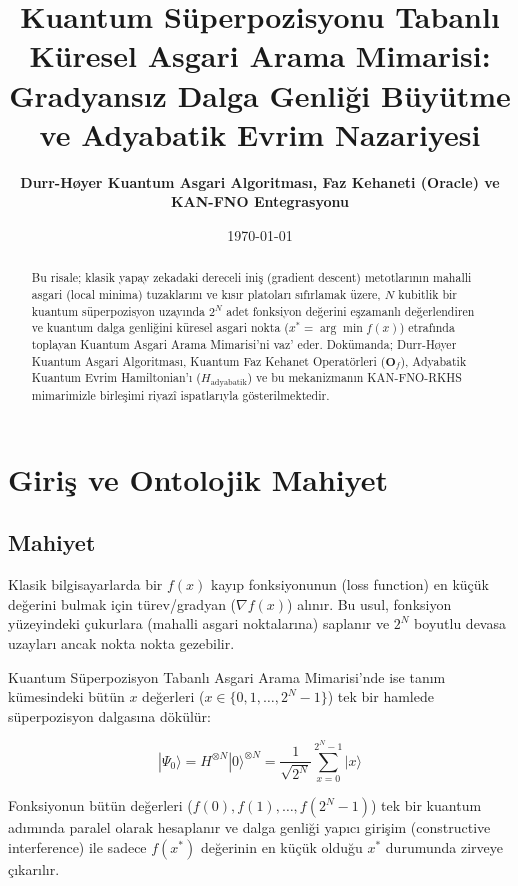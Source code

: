 \documentclass[11pt, a4paper]{article}
\title{\textbf{Kuantum Süperpozisyonu Tabanlı Küresel Asgari Arama Mimarisi: Gradyansız Dalga Genliği Büyütme ve Adyabatik Evrim Nazariyesi}}
\author{\textbf{Durr-Høyer Kuantum Asgari Algoritması, Faz Kehaneti (Oracle) ve KAN-FNO Entegrasyonu}}
\date{\today}
\begin{document}
\maketitle

\begin{abstract}
Bu risale; klasik yapay zekadaki dereceli iniş (gradient descent) metotlarının mahalli asgari (local minima) tuzaklarını ve kısır platoları sıfırlamak üzere, $N$ kubitlik bir kuantum süperpozisyon uzayında $2^N$ adet fonksiyon değerini eşzamanlı değerlendiren ve kuantum dalga genliğini küresel asgari nokta ($x^* = \arg\min f(x)$) etrafında toplayan Kuantum Asgari Arama Mimarisi'ni vaz' eder. Dokümanda; Durr-Høyer Kuantum Asgari Algoritması, Kuantum Faz Kehanet Operatörleri ($\mathbf{O}_f$), Adyabatik Kuantum Evrim Hamiltonian'ı ($H_{\text{adyabatik}}$) ve bu mekanizmanın KAN-FNO-RKHS mimarimizle birleşimi riyazî ispatlarıyla gösterilmektedir.
\end{abstract}

\tableofcontents
\newpage

\section{Giriş ve Ontolojik Mahiyet}

\subsection{Mahiyet}
Klasik bilgisayarlarda bir $f(x)$ kayıp fonksiyonunun (loss function) en küçük değerini bulmak için türev/gradyan ($\nabla f(x)$) alınır. Bu usul, fonksiyon yüzeyindeki çukurlara (mahalli asgari noktalarına) saplanır ve $2^N$ boyutlu devasa uzayları ancak nokta nokta gezebilir. 

Kuantum Süperpozisyon Tabanlı Asgari Arama Mimarisi'nde ise tanım kümesindeki bütün $x$ değerleri ($x \in \{0, 1, \dots, 2^N-1\}$) tek bir hamlede süperpozisyon dalgasına dökülür:

\begin{equation}
|\Psi_0\rangle = H^{\otimes N} |0\rangle^{\otimes N} = \frac{1}{\sqrt{2^N}} \sum_{x=0}^{2^N-1} |x\rangle
\end{equation}

Fonksiyonun bütün değerleri ($f(0), f(1), \dots, f(2^N-1)$) tek bir kuantum adımında paralel olarak hesaplanır ve dalga genliği yapıcı girişim (constructive interference) ile sadece $f(x^*)$ değerinin en küçük olduğu $x^*$ durumunda zirveye çıkarılır.
\end{document}
